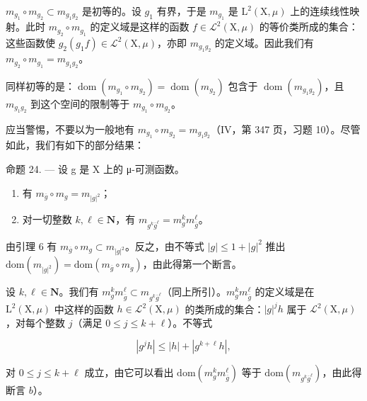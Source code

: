 \(m_{g_{1}} \circ m_{g_{2}} \subset m_{g_{1}g_{2}}\) 是初等的。设 \(g_{1}\) 有界，于是 \(m_{g_{1}}\) 是 \(\mathrm{L}^{2}(\mathrm{X},\mu)\) 上的连续线性映射。此时 \(m_{g_{2}} \circ m_{g_{1}}\) 的定义域是这样的函数 \(f \in \mathcal{L}^{2}(\mathrm{X},\mu)\) 的等价类所成的集合：这些函数使 \(g_{2}(g_{1}f) \in \mathcal{L}^{2}(\mathrm{X},\mu)\)，亦即 \(m_{g_{1}g_{2}}\) 的定义域。因此我们有 \(m_{g_{2}} \circ m_{g_{1}} = m_{g_{1}g_{2}}\)。

同样初等的是：\(\operatorname{dom}(m_{g_{1}} \circ m_{g_{2}}) = \operatorname{dom}(m_{g_{2}})\) 包含于 \(\operatorname{dom}(m_{g_{1}g_{2}})\)，且 \(m_{g_{1}g_{2}}\) 到这个空间的限制等于 \(m_{g_{1}} \circ m_{g_{2}}\)。

应当警惕，不要以为一般地有 \(m_{g_{1}} \circ m_{g_{2}} = m_{g_{1}g_{2}}\)（IV，第 347 页，习题 10）。尽管如此，我们有如下的部分结果：

命题 24. --- 设 g 是 X 上的 μ-可测函数。

\begin{enumerate}
\def\labelenumi{\alph{enumi})}
\item
  有 \(m_{\overline{g}} \circ m_g = m_{|g|^2}\)；
\item
  对一切整数 \(k, \ell \in \mathbf{N}\)，有 \(m_{g^k\overline{g}^\ell} = m_g^k m_{\overline{g}}^\ell\)。
\end{enumerate}

由引理 6 有 \(m_{\overline{g}} \circ m_g \subset m_{|g|^2}\)。反之，由不等式 \(|g| \leqslant 1 + |g|^2\) 推出 \(\text{dom}(m_{|g|^2}) = \text{dom}(m_{\overline{g}} \circ m_g)\)，由此得第一个断言。

设 \(k, \ell \in \mathbf{N}\)。我们有 \(m_g^k m_{\overline{g}}^\ell \subset m_{g^k \overline{g}^\ell}\)（同上所引）。\(m_g^k m_{\overline{g}}^\ell\) 的定义域是在 \(\mathrm{L}^2(\mathrm{X}, \mu)\) 中这样的函数 \(h \in \mathcal{L}^2(\mathrm{X}, \mu)\) 的类所成的集合：\(|g|^j h\) 属于 \(\mathcal{L}^2(\mathrm{X}, \mu)\)，对每个整数 \(j\)（满足 \(0 \leqslant j \leqslant k + \ell\)）。不等式

\[
\left| g ^ {j} h \right| \leqslant | h | + \left| g ^ {k + \ell} h \right|,
\]

对 \(0 \leqslant j \leqslant k + \ell\) 成立，由它可以看出 \(\mathrm{dom}(m_g^k m_{\overline{g}}^\ell)\) 等于 \(\mathrm{dom}(m_{g^k\overline{g}^\ell})\)，由此得断言 \(b\)）。

